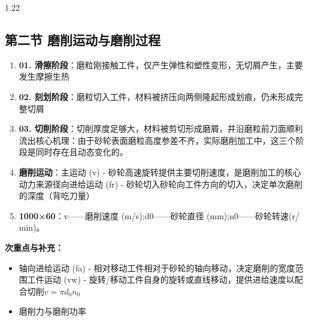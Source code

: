 \documentclass[12pt,a4paper]{article}
\begin{document}
\begin{spacing}{1.22}
\subsection{第二节 磨削运动与磨削过程}
\begin{tcolorbox}[colback=yellow!6,colframe=red!55!black,title=重点,left=1mm,right=1mm]
\begin{enumerate}[leftmargin=2.2em,label=\arabic*.]
  \item \textbf{01. 滑擦阶段}：磨粒刚接触工件，仅产生弹性和塑性变形，无切屑产生，主要发生摩擦生热
  \item \textbf{02. 刻划阶段}：磨粒切入工件，材料被挤压向两侧隆起形成划痕，仍未形成完整切屑
  \item \textbf{03. 切削阶段}：切削厚度足够大，材料被剪切形成磨屑，并沿磨粒前刀面顺利流出核心机理：由于砂轮表面磨粒高度参差不齐，实际磨削加工中，这三个阶段是同时存在且动态变化的。
  \item \textbf{磨削运动}：主运动 (v) - 砂轮高速旋转提供主要切削速度，是磨削加工的核心动力来源径向进给运动 (fr) - 砂轮切入砂轮向工件方向的切入，决定单次磨削的深度（背吃刀量）
  \item \textbf{1000×60}：v——磨削速度 (m/s);d0——砂轮直径 (mm);n0——砂轮转速(r/ min)。
\end{enumerate}
\end{tcolorbox}
\noindent\textbf{次重点与补充：}
\begin{itemize}[leftmargin=2.2em,label=--]
  \item 轴向进给运动 (fa) - 相对移动工件相对于砂轮的轴向移动，决定磨削的宽度范围工件运动 (vw) - 旋转/移动工件自身的旋转或直线移动，提供进给速度以配合切削$v= \pi d_0 n_0$
  \item 磨削力与磨削功率
\end{itemize}


\end{spacing}
\end{document}
